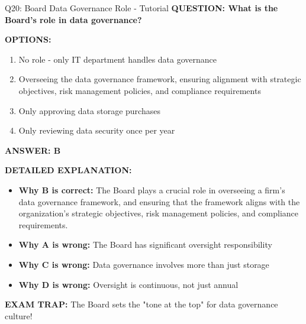 \documentclass[8pt]{beamer}
\begin{document}
	\begin{frame}{Q20: Board Data Governance Role - Tutorial}
		\fontsize{6.5}{7.5}\selectfont
		\textbf{QUESTION: What is the Board's role in data governance?}
		
		\vspace{0.1cm}
		\textbf{OPTIONS:}
		\begin{enumerate}
			\item No role - only IT department handles data governance
			\item Overseeing the data governance framework, ensuring alignment with strategic objectives, risk management policies, and compliance requirements
			\item Only approving data storage purchases
			\item Only reviewing data security once per year
		\end{enumerate}
		
		\vspace{0.1cm}
		\textcolor{myblue}{\textbf{ANSWER: B}}
		
		\vspace{0.1cm}
		\textbf{DETAILED EXPLANATION:}
		\begin{itemize}
			\item \textbf{Why B is correct:} The Board plays a crucial role in overseeing a firm's data governance framework, and ensuring that the framework aligns with the organization's strategic objectives, risk management policies, and compliance requirements.
			\item \textbf{Why A is wrong:} The Board has significant oversight responsibility
			\item \textbf{Why C is wrong:} Data governance involves more than just storage
			\item \textbf{Why D is wrong:} Oversight is continuous, not just annual
		\end{itemize}
		
		\textcolor{myred}{\textbf{EXAM TRAP:}} The Board sets the \textcolor{myblue}{"tone at the top"} for data governance culture!
	\end{frame}
	
	
\end{document}
